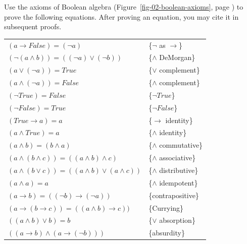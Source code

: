 \begin{ExerciseList}
\Exercise Use the axioms of Boolean algebra (Figure~\ref{fig-02-boolean-axioms}, page \pageref{fig-02-boolean-axioms})
to prove the following equations. After proving an equation, you may cite it in subsequent proofs.
\begin{center}
\label{some-boolean-theorems}
\begin{tabular}{ll}
$(a \rightarrow False) = (\neg a)$                                   & \{$\neg$ as $\rightarrow$\}\label{neg-as-imp} \\
$(\neg(a \wedge b)) = ((\neg a) \vee (\neg b))$                      & \{$\wedge$ DeMorgan\}      \label{and-DeMorgan} \\
$(a \vee (\neg a)) = True$                                           & \{$\vee$ complement\}      \label{or-complement} \\
$(a \wedge (\neg a)) = False$                                        & \{$\wedge$ complement\}    \label{and-complement} \\
$(\neg True) = False$                                                & \{$\neg True$\}            \label{not-True} \\
$(\neg False) = True$                                                & \{$\neg False$\}           \label{not-False} \\
$(True \rightarrow a) = a$                                           & \{$\rightarrow$ identity\} \label{imp-identity} \\
$(a \wedge True) = a$                                                & \{$\wedge$ identity\}      \label{and-identity} \\
$(a \wedge b) = (b \wedge a)$                                        & \{$\wedge$ commutative\}   \label{and-commutative} \\
$(a \wedge (b \wedge c)) = ((a \wedge b) \wedge c)$                  & \{$\wedge$ associative\}   \label{and-associative} \\
$(a \wedge (b \vee c)) = ((a \wedge b) \vee (a \wedge c))$           & \{$\wedge$ distributive\}  \label{and-distributive} \\
$(a \wedge a) = a$                                                   & \{$\wedge$ idempotent\}    \label{and-idempotent} \\
$(a \rightarrow b) = ((\neg b) \rightarrow (\neg a))$                & \{contrapositive\}         \label{contrapositive} \\
$(a \rightarrow (b \rightarrow c)) = ((a \wedge b) \rightarrow c))$  & \{Currying\}               \label{currying} \\
$((a \wedge b) \vee b) = b$                                          & \{$\vee$ absorption\}      \label{or-absorption} \\
$((a \rightarrow b) \wedge (a \rightarrow (\neg b)))$                & \{absurdity\}              \label{absurdity} \\
\end{tabular}
\end{center}

\end{ExerciseList}


